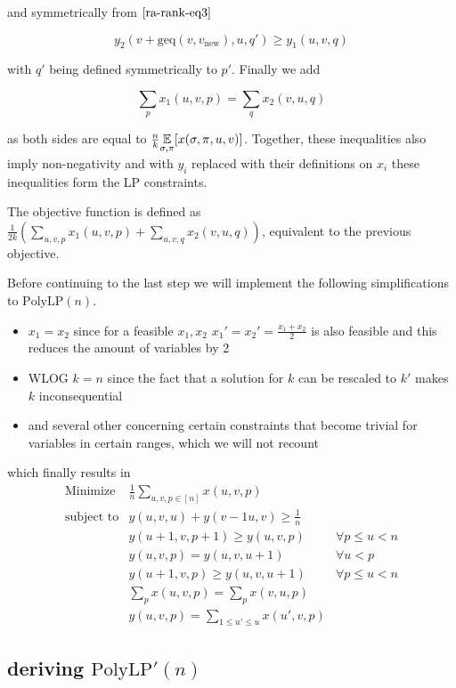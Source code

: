and symmetrically from $\autoref{ra-rank-eq3}$

\begin{equation}
	\label{ra-rank-eq6}
	y_2(v+\mathrm{geq}(v,v_{\mathrm{new}}),u,q')\geq y_1(u,v,q)
\end{equation}

with $q'$ being defined symmetrically to $p'$. Finally we add

\[\sum\limits_p x_1(u,v,p)=\sum\limits_q x_2(v,u,q)\]

as both sides are equal to $\frac{n}{k}\underset{\sigma,\pi}{\mathbb{E}}[x(\sigma,\pi,u,v)]$. Together, these inequalities also imply non-negativity and with $y_i$ replaced with their definitions on $x_i$ these inequalities form the LP constraints.

The objective function is defined as $\frac{1}{2k}\left(\sum\limits_{u,v,p}x_1(u,v,p)+\sum\limits_{u,v,q}x_2(v,u,q)\right)$, equivalent to the previous objective.

Before continuing to the last step we will implement the following simplifications to $\mathrm{PolyLP}(n)$.
\begin{itemize}
	\item $x_1=x_2$ since for a feasible $x_1,x_2$ $x_1'=x_2'=\frac{x_1+x_2}{2}$ is also feasible and this reduces the amount of variables by 2
	\item WLOG $k=n$ since the fact that a solution for $k$ can be rescaled to $k'$ makes $k$ inconsequential
	\item and several other concerning certain constraints that become trivial for variables in certain ranges, which we will not recount
\end{itemize}
which finally results in
\begin{align*}
	\text{Minimize} & \frac{1}{n}\sum\limits_{u,v,p\in[n]}x(u,v,p)\\
	\text{subject to} & y(u,v,u)+y(v-1u,v)\geq \frac{1}{n}\\
	& y(u+1,v,p+1)\geq y(u,v,p) & \forall p\leq u <n\\
	& y(u,v,p)=y(u,v,u+1) & \forall u<p\\
	& y(u+1,v,p)\geq y(u,v,u+1) & \forall p\leq u < n\\
	& \sum\limits_p x(u,v,p)= \sum\limits_p x(v,u,p)\\
	& y(u,v,p)=\sum\limits_{1\leq u'\leq u}x(u',v,p)
\end{align*}

\subsection[deriving PolyLP'(n)]{deriving $\mathrm{PolyLP'}(n)$}

